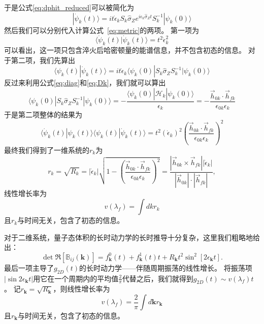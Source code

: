 			于是公式\eqref{eq:dphit_reduced}可以被简化为
			\begin{equation}
				|\dot{\psi}_k(t)\rangle = i t \dot{\epsilon}_k S_k \hat{\sigma}_Z e^{i\epsilon_k \hat{\sigma}_Z t} S_k^{-1}|\psi_k(0)\rangle
			\end{equation}
			然后我们可以分别代入计算公式~\eqref{eq:metric}的两项。
			第一项为
			\begin{equation}
				\langle \dot{\psi}_k(t)|\dot{\psi}_k(t) \rangle = t^2 \dot{\epsilon}_k^2
			\end{equation}
			可以看出，这一项只包含淬火后哈密顿量的能谱信息，并不包含初态的信息。
			对于第二项，我们先算出
			\begin{equation}
				\langle \psi_k(t)|\dot{\psi}_k(t) \rangle = i t \dot{\epsilon}_k \langle \psi_k(0)|S_k \hat{\sigma}_Z S_k^{-1}|\psi_k(0) \rangle
			\end{equation}
			反过来利用公式\eqref{eq:diag}和\eqref{eq:Dk}，我们就可以算出
			\begin{equation}
				\langle \psi_k(0)| S_k \hat{\sigma}_Z S_k^{-1} |\psi_k(0) \rangle= -\frac{\langle \psi_k(0)|\hat{\mathcal{H}}_k|\psi_k(0) \rangle}{\epsilon_k} = -\frac{\vec{h}_{0k}\cdot\vec{h}_{fk} }{\epsilon_{0k}\epsilon_k}
			\end{equation}
			于是第二项整体的结果为
			\begin{equation}
				\langle \dot{\psi}_k(t)|\psi_k(t) \rangle \langle \psi_k(t)|\dot{\psi}_k(t) \rangle = t^2 (\dot{\epsilon}_k)^2 \left(\frac{\vec{h}_{0k}\cdot\vec{h}_{fk}}{\epsilon_{0k}\epsilon_k}\right)^2
			\end{equation}
			最终我们得到了一维系统的$r_k$为
			\begin{equation} \label{Eq:rk_1D}
				r_k = \sqrt{R_k} = |\dot{\epsilon}_k|\sqrt{1-\left(\frac{\vec{h}_{0k}\cdot\vec{h}_{fk}}{\epsilon_{0k}\epsilon_k}\right)^2} = \frac{|{\vec{h}}_{0k}\times \vec{h}_{fk}||\dot{\epsilon}_k|}{|{\vec{h}}_{0k}|\cdot|\vec{h}_{fk}|},
			\end{equation}
			线性增长率为
			\begin{equation}\label{Eq:v_1D}
				v(\lambda_f) = \int dk r_k
			\end{equation}
			且$r_k$与时间无关，包含了初态的信息。
		
			对于二维系统，量子态体积的长时动力学的长时推导十分复杂，这里我们粗略地给出：
			\begin{equation}\label{eq:Rk}
				\det{\Re[\mathbb{B}_{ij}(\mathbf{k})]} = f_\mathbf{k}^0(t)+f_\mathbf{k}^1(t) t+R_\mathbf{k} t^2\sin^2[2 \epsilon_\mathbf{k} t]. 
			\end{equation}
			最后一项主导了$g_{2D}(t)$的长时动力学——伴随周期振荡的线性增长。
			将振荡项$|\sin2\epsilon_{\mathbf{k}}t|$用它在一个周期内的平均值$\frac 2\pi$代替之后，我们就得到$g_{2D}(t)\sim v(\lambda_f)t$。
			记$r_\mathbf{k} = \sqrt{R_{\mathbf{k}}}$，则线性增长率为
			\begin{equation}\label{Eq:v_2D}
				v(\lambda_f)=\frac 2\pi\int d\mathbf{k}r_\mathbf{k}
			\end{equation}
			且$r_{\mathbf{k}}$与时间无关，包含了初态的信息。
			
